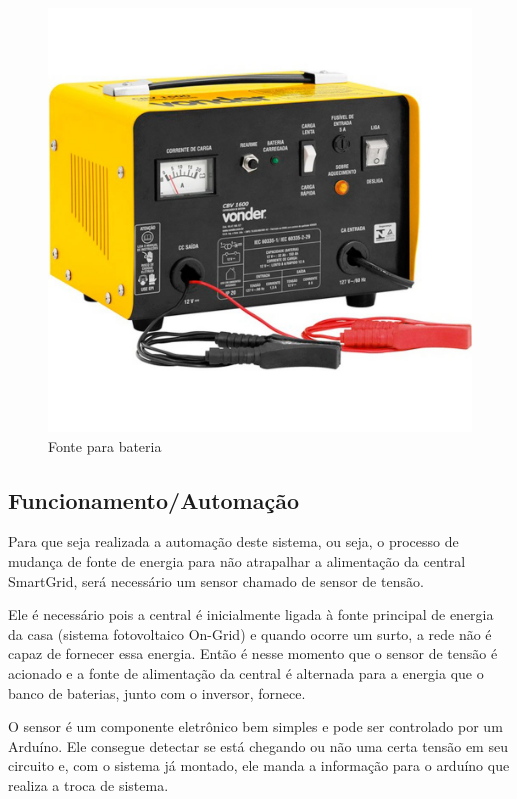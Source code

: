 \begin{figure}[!h]
\centering
\caption{Fonte para bateria}
\includegraphics[width=\textwidth]{figuras/fonte}
\end{figure}

\subsection{Funcionamento/Automação}
\par Para que seja realizada a automação deste sistema, ou seja, o processo de mudança de fonte de energia para não atrapalhar a alimentação da central SmartGrid, será necessário um sensor chamado de sensor de tensão.
\par Ele é necessário pois a central é inicialmente ligada à fonte principal de energia da casa (sistema fotovoltaico On-Grid) e quando ocorre um surto, a rede não é capaz de fornecer essa energia. Então é nesse momento que o sensor de tensão é acionado e a fonte de alimentação da central é alternada para a energia que o banco de baterias, junto com o inversor, fornece.
\par O sensor é um componente eletrônico bem simples e pode ser controlado por um Arduíno. Ele consegue detectar se está chegando ou não uma certa tensão em seu circuito e, com o sistema já montado, ele manda a informação para o arduíno que realiza a troca de sistema.

